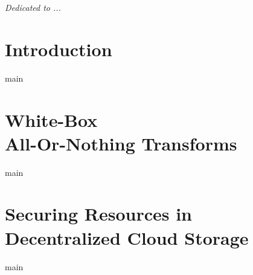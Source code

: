 \documentclass[12pt,a4paper,oldfontcommands,openright]{memoir}
\begin{document}


\cleardoublepage

\cleardoublepage
\thispagestyle{empty}
\begin{abstract}
{main}
\end{abstract}
\cleardoublepage




\tableofcontents*
\cleardoublepage

\listoffigures*
\cleardoublepage



\cleardoublepage
\thispagestyle{empty}
\begin{flushright}
	\itshape Dedicated to ...\\
\end{flushright}
\cleardoublepage




\chapter[Introduction]{Introduction}
\label{chap:intro}
{main}

\chapter[White-Box All-Or-Nothing Transforms]{White-Box\\All-Or-Nothing Transforms}
\label{chap:waont}
{main}

\chapter[Decentralized Cloud Storage]{Securing Resources in Decentralized Cloud Storage}
\label{chap:dcs}
{main}
\end{document}
